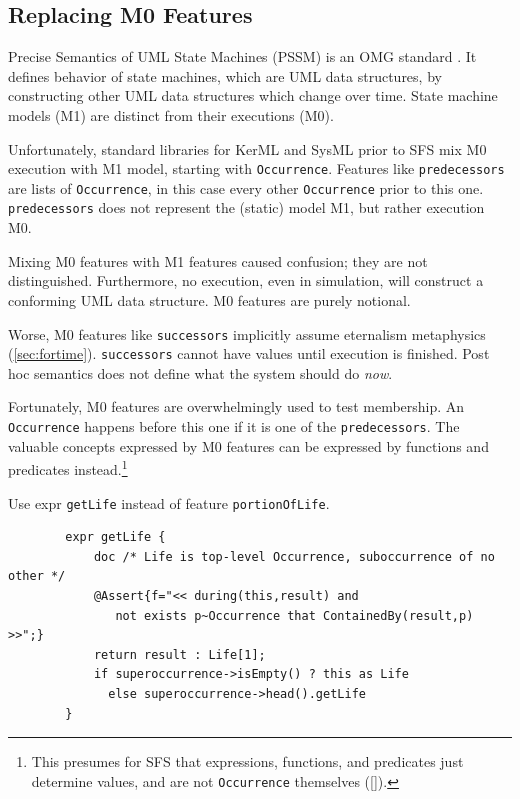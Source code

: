 \subsection{Replacing M0 Features}\label{subsec:replacingM0}

\pn Precise Semantics of UML State Machines (PSSM) is an OMG standard \cite{PSSM}.
It defines behavior of state machines, which are  UML data structures, by constructing other 
 UML data structures which change over time.  State machine models (M1) are distinct from their executions (M0).

\pn Unfortunately, standard libraries for KerML and SysML prior to SFS mix M0 execution with M1 model, starting with \texttt{Occurrence}.
Features like \texttt{predecessors} are lists of \texttt{Occurrence}, in this case every other  \texttt{Occurrence} prior to this one. 
\texttt{predecessors} does not represent the (static) model M1, but rather execution M0.  

\pn Mixing M0 features with M1 features caused confusion; they are not distinguished.  Furthermore, no execution, even in simulation, will construct a conforming UML data structure.  M0 features are purely notional.

\pn Worse, M0 features like \texttt{successors} implicitly assume eternalism metaphysics (\ref{sec:fortime}).   \texttt{successors} cannot have values until execution is finished.  Post hoc semantics does not define what the system should do \emph{now}.

\pn Fortunately, M0 features are overwhelmingly used to test membership.  An \texttt{Occurrence} happens before this one if it is one of the \texttt{predecessors}.  The valuable concepts expressed by M0 features can be expressed by functions and predicates instead.\footnote{
This presumes for SFS that expressions, functions, and predicates just determine values, and are not \texttt{Occurrence} themselves (\ref{}).}

\pn Use expr \texttt{getLife} instead of feature \texttt{portionOfLife}.

\begin{lstlisting}
		expr getLife {
			doc /* Life is top-level Occurrence, suboccurrence of no other */
			@Assert{f="<< during(this,result) and
			   not exists p~Occurrence that ContainedBy(result,p) >>";}
			return result : Life[1];
			if superoccurrence->isEmpty() ? this as Life
			  else superoccurrence->head().getLife	
		}
\end{lstlisting}

